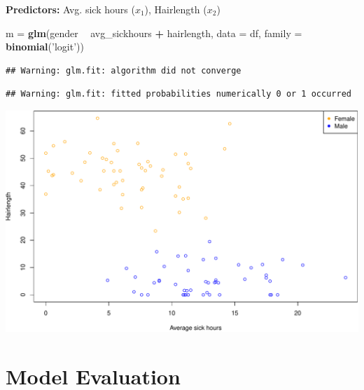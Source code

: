 \documentclass[
  ignorenonframetext,
]{beamer}
\newenvironment{Shaded}{\begin{snugshade}}{\end{snugshade}}
\newcommand{\DataTypeTok}[1]{\textcolor[rgb]{0.13,0.29,0.53}{#1}}
\newcommand{\KeywordTok}[1]{\textcolor[rgb]{0.13,0.29,0.53}{\textbf{#1}}}
\newcommand{\NormalTok}[1]{#1}
\newcommand{\OperatorTok}[1]{\textcolor[rgb]{0.81,0.36,0.00}{\textbf{#1}}}
\newcommand{\StringTok}[1]{\textcolor[rgb]{0.31,0.60,0.02}{#1}}
\begin{document}
\begin{frame}[fragile]

\textbf{Predictors:} Avg. sick hours (\(x_1\)), Hairlength (\(x_2\))

\tiny

\begin{Shaded}
\begin{Highlighting}[]
\NormalTok{m =}\StringTok{ }\KeywordTok{glm}\NormalTok{(gender }\OperatorTok{~}\StringTok{ }\NormalTok{avg_sickhours }\OperatorTok{+}\StringTok{ }\NormalTok{hairlength, }\DataTypeTok{data =}\NormalTok{ df, }\DataTypeTok{family =} \KeywordTok{binomial}\NormalTok{(}\StringTok{'logit'}\NormalTok{))}
\end{Highlighting}
\end{Shaded}

\begin{verbatim}
## Warning: glm.fit: algorithm did not converge
\end{verbatim}

\begin{verbatim}
## Warning: glm.fit: fitted probabilities numerically 0 or 1 occurred
\end{verbatim}

\normalsize

\tiny

\includegraphics[width=7\linewidth,height=0.7\textheight]{Schmitt_Marvin_binary_response_files/figure-beamer/unnamed-chunk-13-1}
\normalsize

\end{frame}

\hypertarget{model-evaluation}{%
\section{Model Evaluation}\label{model-evaluation}}
\end{document}
